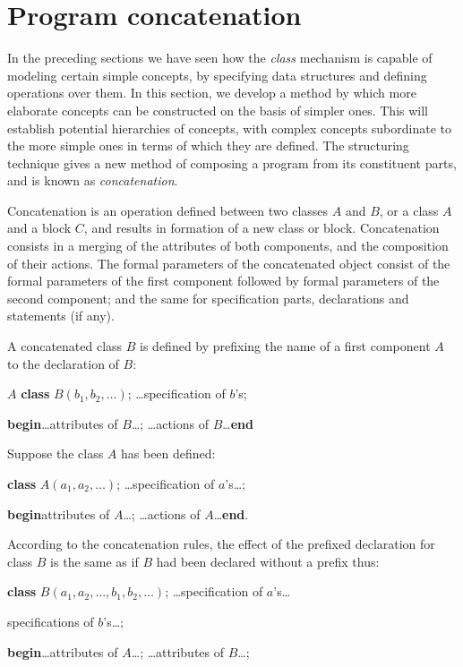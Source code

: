 \documentclass[twoside,11pt]{book}
\begin{document}
\section{Program concatenation}

In the preceding sections we have seen how the \textit{class} mechanism is capable of modeling certain simple concepts, by specifying data structures and defining operations over them. In this section, we develop a method by which more elaborate concepts can be constructed on the basis of simpler ones. This will establish potential hierarchies of concepts, with complex concepts subordinate to the more simple ones in terms of which they are defined. The structuring technique gives a new method of composing a program from its constituent parts, and is known as \textit{concatenation}.

Concatenation is an operation defined between two classes $A$ and $B$, or a class $A$ and a block $C$, and results in formation of a new class or block. Concatenation consists in a merging of the attributes of both components, and the composition of their actions. The formal parameters of the concatenated object consist of the formal parameters of the first component followed by formal parameters of the second component; and the same for specification parts, declarations and statements (if any).

A concatenated class $B$ is defined by prefixing the name of a first component $A$ to the declaration of $B$:

\quad $A$ \textbf{class} $B(b_1, b_2, \dots)$; \dots specification of $b$'s;

\quad\quad \textbf{begin}\dots attributes of $B$\dots; \dots actions of $B$\dots \textbf{end}

\noindent
Suppose the class $A$ has been defined:

\quad \textbf{class} $A(a_1, a_2 , \dots)$; \dots specification of $a$'s\dots;

\quad \quad \textbf{begin}\quad attributes of $A$\dots; \dots actions of $A$\dots \textbf{end}.

According to the concatenation rules, the effect of the prefixed declaration
for class $B$ is the same as if $B$ had been declared without a prefix thus:

\quad \textbf{class} $B(a_1, a_2, \dots, b_1, b_2, \dots)$; \dots specification of $a$'s\dots

\quad \quad \quad specifications of $b$'s\dots;

\quad \quad \textbf{begin}\dots attributes of $A$\dots; \dots attributes of $B$\dots;
\end{document}

